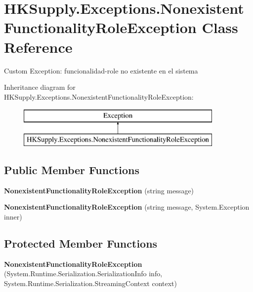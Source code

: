 \hypertarget{class_h_k_supply_1_1_exceptions_1_1_nonexistent_functionality_role_exception}{}\section{H\+K\+Supply.\+Exceptions.\+Nonexistent\+Functionality\+Role\+Exception Class Reference}
\label{class_h_k_supply_1_1_exceptions_1_1_nonexistent_functionality_role_exception}


Custom Exception\+: funcionalidad-\/role no existente en el sistema  


Inheritance diagram for H\+K\+Supply.\+Exceptions.\+Nonexistent\+Functionality\+Role\+Exception\+:\begin{figure}[H]
\begin{center}
\leavevmode
\includegraphics[height=2.000000cm]{class_h_k_supply_1_1_exceptions_1_1_nonexistent_functionality_role_exception}
\end{center}
\end{figure}
\subsection*{Public Member Functions}
\begin{DoxyCompactItemize}
\item 
\mbox{\label{class_h_k_supply_1_1_exceptions_1_1_nonexistent_functionality_role_exception_a18ae6c3bbed13d776fbb7407c8c0f839}} 
{\bfseries Nonexistent\+Functionality\+Role\+Exception} (string message)
\item 
\mbox{\label{class_h_k_supply_1_1_exceptions_1_1_nonexistent_functionality_role_exception_a67c9cb11b716effbea92f6daf598e28f}} 
{\bfseries Nonexistent\+Functionality\+Role\+Exception} (string message, System.\+Exception inner)
\end{DoxyCompactItemize}
\subsection*{Protected Member Functions}
\begin{DoxyCompactItemize}
\item 
\mbox{\label{class_h_k_supply_1_1_exceptions_1_1_nonexistent_functionality_role_exception_a1c0eef709cc0b2418bc628dfd1199dd1}} 
{\bfseries Nonexistent\+Functionality\+Role\+Exception} (System.\+Runtime.\+Serialization.\+Serialization\+Info info, System.\+Runtime.\+Serialization.\+Streaming\+Context context)
\end{DoxyCompactItemize}


